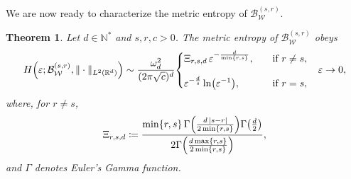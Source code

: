 \documentclass[a4paper,12pt]{article}
\newtheorem{theorem}{Theorem}%
\let\originalleft\left
\let\originalright\right
\renewcommand{\left}{\mathopen{}\mathclose\bgroup\originalleft}
\renewcommand{\right}{\aftergroup\egroup\originalright}
\newcommand{\N}{\mathbb{N}}
\newcommand{\R}{\mathbb{R}}
\begin{document}
We are now ready to characterize the metric entropy of
$\mathcal{B}_{\mathcal{W}}^{(s,r)}$.

\begin{theorem}\label{thm:sob-weighted}
Let $d \in \N^*$ and $s,r,c>0$. 
The metric entropy of $\mathcal{B}_{\mathcal{W}}^{(s,r)}$ obeys
\begin{equation*}
    H \left(\varepsilon;\mathcal{B}_{\mathcal{W}}^{(s,r)}, \|\cdot\|_{L^2(\R^d)}\right)
    \sim \frac{\omega_d^2}{(2\pi\sqrt{c})^{d}}
    \begin{dcases}
        \Xi_{r,s,d}\, \varepsilon^{-\frac{d}{\min\{r,s\}}}, 
        \quad &\text{if } r\neq s,\\[.25cm]           
        \varepsilon^{-\frac{d}{s}}\ln\left(\varepsilon^{-1}\right), \quad &\text{if } r=s,
    \end{dcases}
    \quad  \varepsilon\to 0,
\end{equation*}
where, for $r \neq s$,
\begin{equation}\label{eq:expression-constant-sobw}
     \Xi_{r,s,d}
     \coloneqq \frac{\min\{r,s\} \, \Gamma\left(\frac{d \, |s-r| }{2 \min\{r,s\}}\right) \Gamma \left( \frac{d}{2} \right)}{2\Gamma \left(\frac{d\max\{r,s\} }{2\min\{r,s\} }\right)}, 
\end{equation}
and $\Gamma$ denotes Euler's Gamma function.
\end{theorem}
\color{black}
\end{document}
